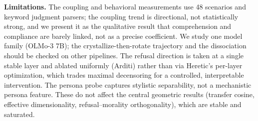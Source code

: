 \textbf{Limitations.} The coupling and behavioral measurements use 48 scenarios and
keyword judgment parsers; the coupling trend is directional, not statistically
strong, and we present it as the qualitative result that comprehension and
compliance are barely linked, not as a precise coefficient. We study one model
family (OLMo-3 7B); the crystallize-then-rotate trajectory and the dissociation
should be checked on other pipelines. The refusal direction is taken at a single
stable layer and ablated uniformly (Arditi) rather than via Heretic's per-layer
optimization, which trades maximal decensoring for a controlled, interpretable
intervention. The persona probe captures stylistic separability, not a
mechanistic persona feature. These do not affect the central geometric results
(transfer cosine, effective dimensionality, refusal--morality orthogonality),
which are stable and saturated.
